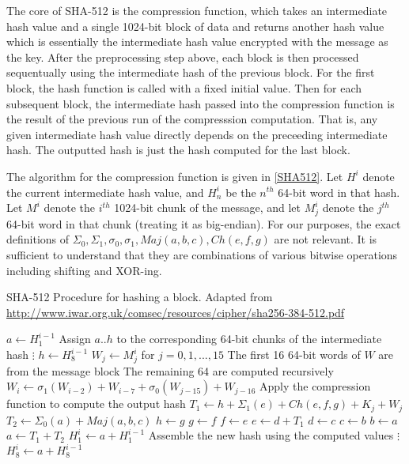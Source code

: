 The core of SHA-512 is the compression function, which takes an intermediate hash value and a single 1024-bit
block of data and returns another hash value which is essentially the intermediate hash value encrypted
with the message as the key. After the preprocessing step above,
each block is then processed sequentually using the
intermediate hash of the previous block.
For the first block, the hash function is called with a fixed initial value. Then for each subsequent
block, the intermediate hash passed into the compression function is the result of the previous run of the
compresssion computation. That is, any given intermediate hash value directly depends on the preceeding
intermediate hash. The outputted hash is just the hash computed for the last block.

The algorithm for the compression function is given in \ref{SHA512}. Let $H^i$ denote the current
intermediate hash value, and $H^i_n$ be the $n^{th}$ 64-bit word in that hash. Let $M^i$ denote the
$i^{th}$ 1024-bit chunk of the message, and let $M^i_j$ denote the $j^{th}$ 64-bit word in that chunk (treating it as big-endian).
For our purposes, the exact definitions of $\Sigma_0, \Sigma_1, \sigma_0, \sigma_1, Maj(a,b,c),
Ch(e,f,g)$ are not relevant. It is sufficient to understand that they are combinations of various bitwise
operations including shifting and XOR-ing.

\begin{algorithm}[!htb]
  \label{SHA512}
  \caption{SHA-512 Procedure for hashing a block. Adapted from \url{http://www.iwar.org.uk/comsec/resources/cipher/sha256-384-512.pdf}}
  \begin{algorithmic}
    \State $a \leftarrow H^{i-1}_1$
    \Comment Assign $a..h$ to the corresponding 64-bit chunks of the intermediate hash
    \State $\vdots$
    \State $h \leftarrow H^{i-1}_8$
    \State $W_j \leftarrow M_j^i$ for $j=0,1,...,15$
    \Comment The first 16 64-bit words of $W$ are from the message block
    \Comment The remaining 64 are computed recursively
      \State $W_i \leftarrow \sigma_1(W_{i-2}) + W_{i-7} + \sigma_0(W_{j-15}) + W_{j-16}$
    \EndFor
      \Comment Apply the compression function to compute the output hash
      \State $T_1 \leftarrow h + \Sigma_1(e) + Ch(e,f,g) + K_j + W_j$
      \State $T_2 \leftarrow \Sigma_0(a) + Maj(a,b,c)$
      \State $h \leftarrow g$
      \State $g \leftarrow f$
      \State $f \leftarrow e$
      \State $e \leftarrow d + T_1$
      \State $d \leftarrow c$
      \State $c \leftarrow b$
      \State $b \leftarrow a$
      \State $a \leftarrow T_1 + T_2$
    \EndFor
    \State $H_1^i \leftarrow a + H^{i-1}_1$
    \Comment Assemble the new hash using the computed values
    \State $\vdots$
    \State $H_8^i \leftarrow a + H^{i-1}_8$
    \EndProcedure
  \end{algorithmic}
\end{algorithm}

